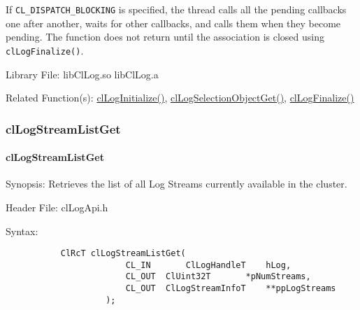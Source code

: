 \begin{flushleft}
\begin{Desc}
\par 
If {\tt{CL\_\-DISPATCH\_\-BLOCKING}} is specified, the thread calls all the pending callbacks one after another, waits for other callbacks, and calls
them when they become pending. The function does not return until the association is closed using {\tt{clLogFinalize()}}.
\end{Desc}
\begin{Desc}
\item[Library File:] libClLog.so
\newline
libClLog.a\end{Desc}
\begin{Desc}
\item[Related Function(s):]\hyperlink{pagelog101}{clLogInitialize()}, \hyperlink{pagelog103}{clLogSelectionObjectGet()}, 
\hyperlink{pagelog102}{clLogFinalize()}\end{Desc}
\newpage




\subsubsection{clLogStreamListGet}
\hypertarget{pagelog105}{}\paragraph{cl\-Log\-Stream\-List\-Get}\label{pagelog105}
\begin{Desc}
\item[Synopsis:] Retrieves the list of all Log Streams currently available in the cluster.\end{Desc}
\begin{Desc}
\item[Header File:] clLogApi.h \end{Desc}
\begin{Desc}
\item[Syntax:]
\footnotesize\begin{verbatim}        	ClRcT clLogStreamListGet(
						CL_IN		ClLogHandleT	hLog,
						CL_OUT	ClUint32T		*pNumStreams,
						CL_OUT	ClLogStreamInfoT	**ppLogStreams
					);


\end{verbatim}
\end{Desc}
\end{flushleft}
